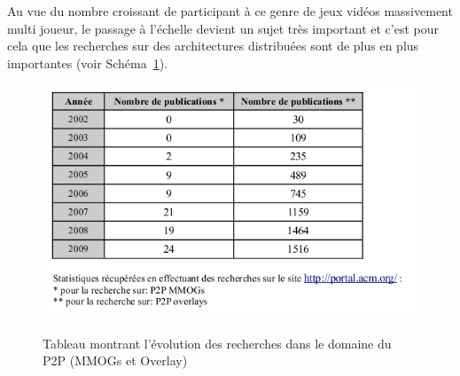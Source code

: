 	Au vue du nombre croissant de participant à ce genre de jeux vidéos massivement multi joueur, le passage à l'échelle devient un sujet très important et c'est pour cela que les recherches sur des architectures distribuées sont de plus en plus importantes (voir Schéma~\ref{stat_P2P}). \\
	\vspace{5mm} 
        \begin{figure}[!h]
        \centering
        \includegraphics[scale=0.85]{./Ressources/Images/Stat_Rech_P2P.png}\\
        \caption{Tableau montrant l'évolution des recherches dans le domaine du P2P (MMOGs et Overlay)}
        \label{stat_P2P}
        \end{figure}
